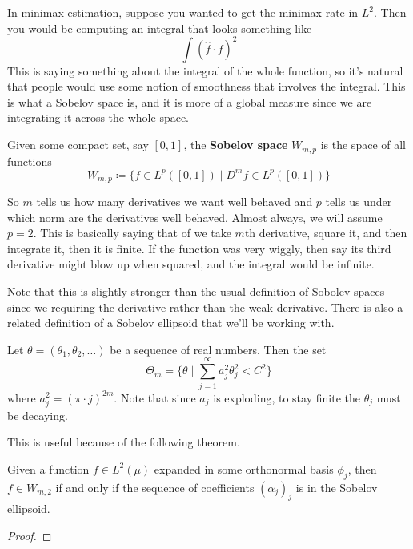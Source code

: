   In minimax estimation, suppose you wanted to get the minimax rate in $L^2$. Then you would be computing an integral that looks something like 
  \begin{equation}
    \int (\hat{f} \cdot f)^2
  \end{equation}
  This is saying something about the integral of the whole function, so it's natural that people would use some notion of smoothness that involves the integral. This is what a Sobelov space is, and it is more of a global measure since we are integrating it across the whole space. 

  \begin{definition}
    Given some compact set, say $[0, 1]$, the \textbf{Sobelov space} $W_{m, p}$ is the space of all functions 
    \begin{equation}
      W_{m, p} \coloneqq \{ f \in L^p ([0, 1]) \mid D^m f \in L^p([0, 1]) \}
    \end{equation}
  \end{definition}

  So $m$ tells us how many derivatives we want well behaved and $p$ tells us under which norm are the derivatives well behaved. Almost always, we will assume $p = 2$. This is basically saying that of we take $m$th derivative, square it, and then integrate it, then it is finite. If the function was very wiggly, then say its third derivative might blow up when squared, and the integral would be infinite.  

  Note that this is slightly stronger than the usual definition of Sobolev spaces since we requiring the derivative rather than the weak derivative. 
  There is also a related definition of a Sobelov ellipsoid that we'll be working with. 

  \begin{definition}
    Let $\theta = (\theta_1, \theta_2, \ldots)$ be a sequence of real numbers. Then the set 
    \begin{equation}
      \Theta_m = \bigg\{ \theta \mid \sum_{j=1}^\infty a_j^2 \theta_j^2 < C^2 \bigg\}
    \end{equation}
    where $a_j^2 = (\pi \cdot j)^{2m}$. Note that since $a_j$ is exploding, to stay finite the $\theta_j$ must be decaying.
  \end{definition}

  This is useful because of the following theorem. 
  
  \begin{theorem}
    Given a function $f \in L^2(\mu)$ expanded in some orthonormal basis $\phi_j$, then $f \in W_{m, 2}$ if and only if the sequence of coefficients $(\alpha_j)_j$ is in the Sobelov ellipsoid. 
  \end{theorem}
  \begin{proof}
    
  \end{proof}

